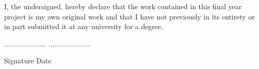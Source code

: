 
\begin{declaration} %

I, the undersigned, hereby declare that the work contained in this final year project is my own original work and that I have not previously in its entirety or in part submitted it at any university for a degree.


\vspace{1cm}





$\ldots\ldots\ldots\ldots\ldots\ldots\ldots$ \tab \tab \tab \tab \tab \tab $\ldots\ldots\ldots\ldots\ldots\ldots\ldots$

\tab Signature \tab \tab \tab \tab \tab \tab \tab \tab \tab Date



\end{declaration}


